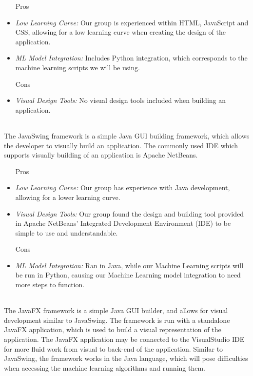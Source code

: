 \documentclass[12pt,journal,compsoc]{IEEEtran}
\newenvironment{subs}
  {\adjustwidth{1em}{0pt}}
  {\endadjustwidth}
\begin{document}
\begin{subs}
\begin{subs}
\begin{subs}
\begin{subs}
\begin{itemize}
    \item [{Pros}]
    \item \emph{Low Learning Curve:} Our group is experienced within HTML, JavaScript and CSS, allowing for a low learning curve when creating the design of the application. 
    \item \emph{ML Model Integration:} Includes Python integration, which corresponds to the machine learning scripts we will be using.
    \item [{Cons}]
    \item \emph{Visual Design Tools:} No visual design tools included when building an application.
\end{itemize}
\end{subs}

\\
The JavaSwing framework is a simple Java GUI building framework, which allows the developer to visually build an application. The commonly used IDE which supports visually building of an application is Apache NetBeans. 

\begin{subs}
\begin{itemize}
    \item [{Pros}]
    \item \emph{Low Learning Curve:} Our group has experience with Java development, allowing for a lower learning curve. 
    \item \emph{Visual Design Tools:} Our group found the design and building tool provided in Apache NetBeans’ Integrated Development Environment (IDE) to be simple to use and understandable.
    \item [{Cons}]
    \item \emph{ML Model Integration:} Ran in Java, while our Machine Learning scripts will be run in Python, causing our Machine Learning model integration to need more steps to function.
\end{itemize}
\end{subs}

\\
The JavaFX framework is a simple Java GUI builder, and allows for visual development similar to JavaSwing. The framework is run with a standalone JavaFX application, which is used to build a visual representation of the application. The JavaFX application may be connected to the VisualStudio IDE for more fluid work from visual to back-end of the application. Similar to JavaSwing, the framework works in the Java language, which will pose difficulties when accessing the machine learning algorithms and running them. 


\end{subs}
\end{subs}
\end{subs}
\end{document}
